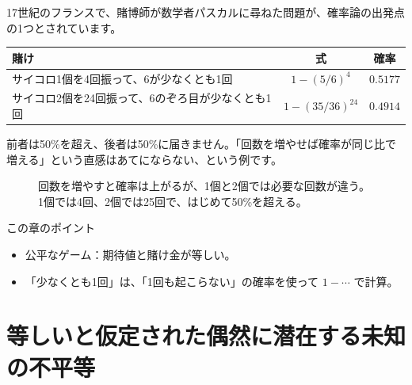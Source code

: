\documentclass[a4paper,11pt,openany]{ltjsbook}
\begin{document}
17世紀のフランスで、賭博師が数学者パスカルに尋ねた問題が、確率論の出発点の1つとされています。

\begin{center}
\begin{tabular}{lcc}
\toprule
賭け & 式 & 確率\\
\midrule
サイコロ1個を4回振って、6が少なくとも1回 & $1-(5/6)^4$ & $0.5177$\\
サイコロ2個を24回振って、6のぞろ目が少なくとも1回 & $1-(35/36)^{24}$ & $0.4914$\\
\bottomrule
\end{tabular}
\end{center}

前者は50\%を超え、後者は50\%に届きません。「回数を増やせば確率が同じ比で増える」という直感はあてにならない、という例です。

\begin{figure}[htbp]
\centering
{}
\caption{回数を増やすと確率は上がるが、1個と2個では必要な回数が違う。1個では4回、2個では25回で、はじめて50\%を超える。}
\end{figure}

\begin{pointbox}{この章のポイント}
\begin{itemize}[leftmargin=1.5em]
\item 公平なゲーム：期待値と賭け金が等しい。
\item 「少なくとも1回」は、「1回も起こらない」の確率を使って $1-\cdots$ で計算。
\end{itemize}
\end{pointbox}

\chapter{等しいと仮定された偶然に潜在する未知の不平等}
\end{document}
